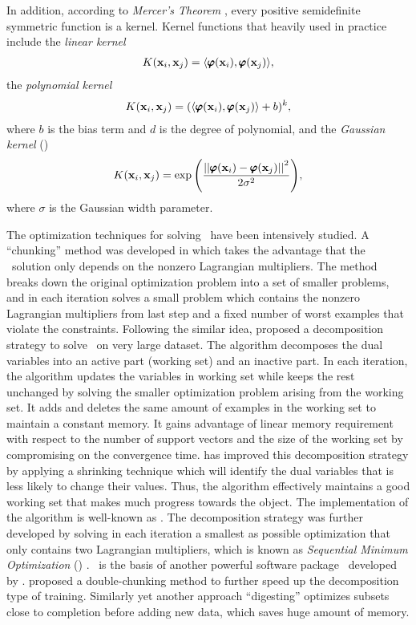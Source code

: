 {In addition, according to \textit{Mercer's Theorem} \citep{taylor04}, every positive semidefinite symmetric function is a kernel.
Kernel functions that heavily used in practice include the \textit{linear kernel}
\begin{align*}
	K(\mathbf {x}_i,\mathbf {x}_j) = \langle \pmb \varphi(\mathbf {x}_i), \pmb \varphi(\mathbf {x}_j) \rangle,
\end{align*}
the \textit{polynomial kernel}
\begin{align*}
	K(\mathbf {x}_i,\mathbf {x}_j) = (\langle \pmb \varphi(\mathbf {x}_i), \pmb \varphi(\mathbf {x}_j) \rangle + b)^k,
\end{align*}
where $b$ is the bias term and $d$ is the degree of polynomial, and the \textit{Gaussian kernel} (\rbf)
\begin{align*}
	K(\mathbf {x}_i,\mathbf {x}_j) = \exp{\left(\frac{\left|\left| {\pmb \varphi(\mathbf {x}_i)}-{\pmb \varphi(\mathbf {x}_j)} \right|\right|^2}{2\sigma^2}\right)},
\end{align*}
where $\sigma$ is the Gaussian width parameter.

The optimization techniques for solving \svm\ have been intensively studied.
A ``chunking'' method was developed in \citep{Vapnik82estimation} which takes the advantage that the \svm\ solution only depends on the nonzero Lagrangian multipliers.
The method breaks down the original optimization problem into a set of smaller problems, and in each iteration solves a small problem which contains the nonzero Lagrangian multipliers from last step and a fixed number of worst examples that violate the constraints.
Following the similar idea, \citet{Osuna97an} proposed a decomposition strategy to solve \svm\ on very large dataset.
The algorithm decomposes the dual variables into an active part (working set) and an inactive part.
In each iteration, the algorithm updates the variables in working set while keeps the rest unchanged by solving the smaller optimization problem arising from the working set.
It adds and deletes the same amount of examples in the working set to maintain a constant memory.
It gains advantage of linear memory requirement with respect to the number of support vectors and the size of the working set by compromising on the convergence time.
\citet{Joachims98making} has improved this decomposition strategy by applying a shrinking technique which will identify the dual variables that is less likely to change their values.
Thus, the algorithm effectively maintains a good working set that makes much progress towards the object.
The implementation of the algorithm is well-known as \svmlight.
The decomposition strategy was further developed by solving in each iteration a smallest as possible optimization that only contains two Lagrangian multipliers, which is known as \textit{Sequential Minimum Optimization} (\smo) \citep{Platt98sequential,Platt99fast}.
\smo\ is the basis of another powerful software package \libsvm\ developed by \citet{Chang11libsvm}.
\citet{Perezcruz04double} proposed a double-chunking method to further speed up the decomposition type of training. 
Similarly yet another approach ``digesting'' \citep{Decoste02support} optimizes subsets close to completion before adding new data, which saves huge amount of memory.

}
